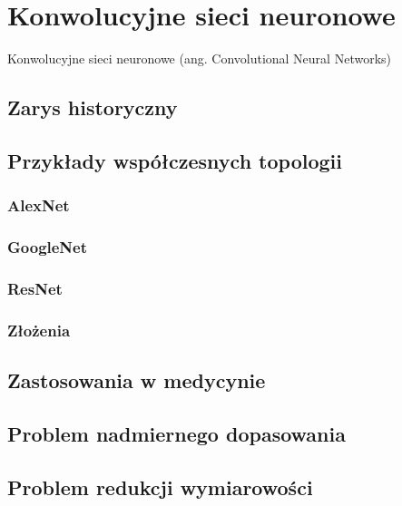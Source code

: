 \chapter{Konwolucyjne sieci neuronowe}
Konwolucyjne sieci neuronowe (ang. Convolutional Neural Networks)
\section{Zarys historyczny}
\section{Przykłady współczesnych topologii}
\subsection{AlexNet}
\subsection{GoogleNet}
\subsection{ResNet}
\subsection{Złożenia}
\section{Zastosowania w medycynie}
\section{Problem nadmiernego dopasowania}
\section{Problem redukcji wymiarowości}